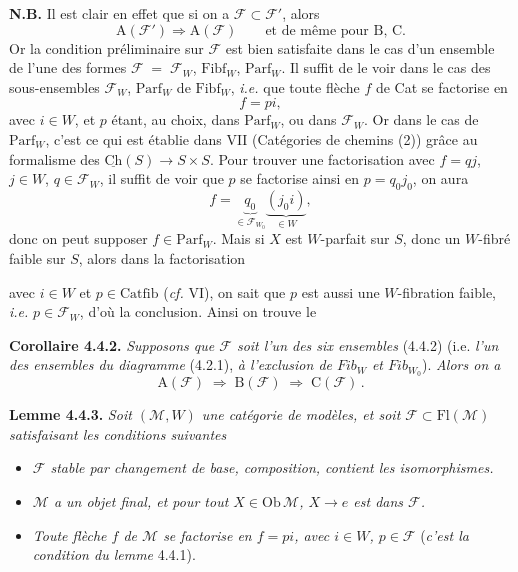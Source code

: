 \documentclass[11pt]{article}
\newcommand{\msp}[1]{\marginpar{\footnotesize [#1]}}
\newcommand{\cF}{\mathcal{F}}
\newcommand{\cM}{\mathcal{M}}
\newcommand{\Fibf}{\mathrm{Fibf}}
\newcommand{\Parf}{\mathrm{Parf}}
\newcommand{\Fl}{\mathrm{Fl}}
\newcommand{\Catfib}{\mathrm{Catfib}}
\begin{document}
\textbf{N.B.} Il est clair en effet que si on a $\cF \subset \cF'$, alors
\[
\mathrm{A}(\cF') \Longrightarrow \mathrm{A}(\cF) \qquad \text{et de même pour B, C.}
\tag*{$(*)$}
\]
Or la condition préliminaire sur $\cF$ est bien satisfaite dans le cas d'un ensemble de l'une des formes $\cF \;=\; \cF_W$, $\Fibf_W$, $\Parf_W$. Il suffit de le voir dans le cas des sous-ensembles $\cF_W$, $\Parf_W$ de $\Fibf_W$, \textit{i.e.} que toute flèche $f$ de Cat se factorise en
\[
f = pi,
\]
avec $i \in W$, et $p$ étant, au choix, dans $\Parf_W$, ou dans $\cF_W$. Or dans le cas de $\Parf_W$, \marginpar{$\|$}c'est ce qui est établie dans VII (Catégories de chemins (2)) grâce au formalisme des $\underline{\mathrm{Ch}}(S) \longrightarrow S \times S$. Pour trouver une factorisation avec $f = qj$, $j \in W$, $q \in \cF_W$, il suffit de voir que $p$ se factorise ainsi en $p = q_0 j_0$, on aura %
\[
f = \underbrace{q_0}_{\in \cF_{W_0}} \underbrace{(j_0 i)}_{\in W},
\]
donc on peut supposer $f \in \Parf_W$. Mais si $X$ est $W$-parfait sur $S$, donc un
\msp{page 43}
$W$-fibré faible sur $S$, alors dans la factorisation
\begin{center}
\end{center}
avec $i \in W$ et $p \in \Catfib$ (\textit{cf.} VI), on sait que $p$ est aussi une $W$-fibration faible, \textit{i.e.} $p \in \cF_W$, d'où la conclusion. Ainsi on trouve le

\textbf{Corollaire 4.4.2.} \textit{Supposons que $\cF$ soit l'un des six ensembles} (4.4.2) (i.e. \textit{l'un des ensembles du diagramme} (4.2.1), \textit{à l'exclusion de $\mathit{Fib}_W$ et $\mathit{Fib}_{W_0}$}). \textit{Alors on a}
\[
\mathrm{A}(\cF) \;\Longrightarrow\; \mathrm{B}(\cF) \;\Longrightarrow\; \mathrm{C}(\cF)\,.
\]

\textbf{Lemme 4.4.3.} \textit{Soit $(\cM, W)$ une catégorie de modèles, et soit $\cF \subset \Fl(\cM)$ satisfaisant les conditions suivantes}
\begin{itemize}[leftmargin=3em]
\item[1)] \textit{$\cF$ stable par changement de base, composition, contient les isomorphismes.}
\item[2)] \textit{$\cM$ a un objet final, et pour tout $X \in \mathrm{Ob}\,\cM$, $X \longrightarrow e$ est dans $\cF$.}
\item[3)] \textit{Toute flèche $f$ de $\cM$ se factorise en $f = pi$, avec $i \in W$, $p \in \cF$} (\textit{c'est la condition du lemme} 4.4.1).
\end{itemize}
\end{document}
